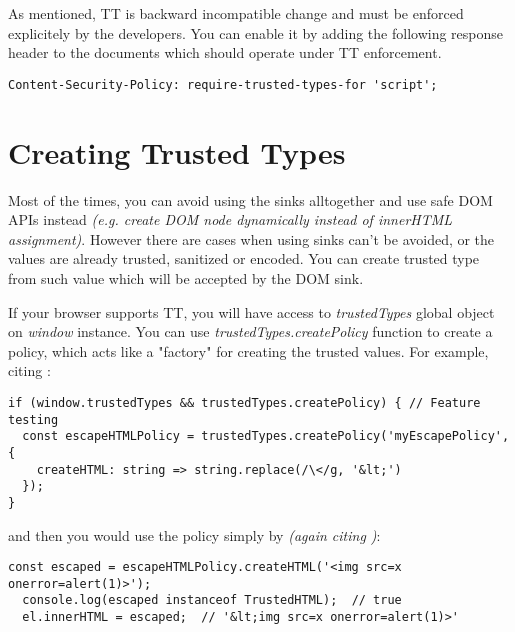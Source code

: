 As mentioned, TT is backward incompatible change and must be enforced explicitely by the developers.
You can enable it by adding the following response header to the documents which should operate
under TT enforcement.

\bigskip
\begin{lstlisting}[language={}, caption={Enforcing Trusted Types}]
  Content-Security-Policy: require-trusted-types-for 'script';
\end{lstlisting}

\section{Creating Trusted Types}

Most of the times, you can avoid using the sinks alltogether and use safe DOM APIs instead
\emph{(e.g. create DOM node dynamically instead of innerHTML assignment)}. However there are cases
when using sinks can't be avoided, or the values are already trusted, sanitized or encoded. You can
create trusted type from such value which will be accepted by the DOM sink.

If your browser supports TT, you will have access to \emph{trustedTypes} global object on
\emph{window} instance. You can use \emph{trustedTypes.createPolicy} function to create a policy,
which acts like a "factory" for creating the trusted values. For example, citing
\cite{trusted_types_into}:

\bigskip
\begin{lstlisting}[language=ES6, caption={Creating Trusted Types policy}]
  if (window.trustedTypes && trustedTypes.createPolicy) { // Feature testing
  const escapeHTMLPolicy = trustedTypes.createPolicy('myEscapePolicy', {
    createHTML: string => string.replace(/\</g, '&lt;')
  });
}
\end{lstlisting}

and then you would use the policy simply by \emph{(again citing \cite{trusted_types_into})}:

\bigskip
\begin{lstlisting}[language=ES6, caption={Using the policy to create Trusted value}]
  const escaped = escapeHTMLPolicy.createHTML('<img src=x onerror=alert(1)>');
  console.log(escaped instanceof TrustedHTML);  // true
  el.innerHTML = escaped;  // '&lt;img src=x onerror=alert(1)>'
\end{lstlisting}

